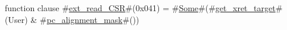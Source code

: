 function clause #\hyperref[sailRISCVzextzyreadzyCSR]{ext\_read\_CSR}#(0x041) = #\hyperref[sailRISCVzSome]{Some}#(#\hyperref[sailRISCVzgetzyxretzytarget]{get\_xret\_target}#(User) & #\hyperref[sailRISCVzpczyalignmentzymask]{pc\_alignment\_mask}#())
